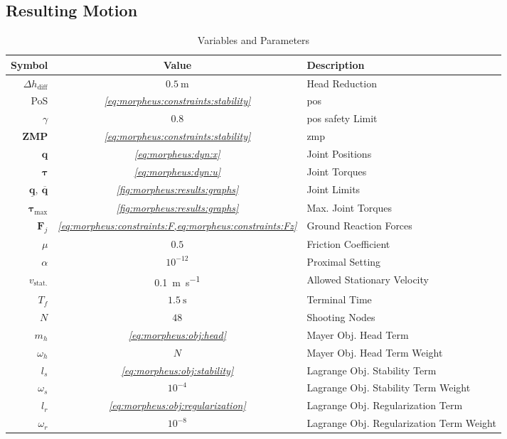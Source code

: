 \subsection{Resulting Motion} \label{sec:morpheus:results}
\begin{table}[h]
  \centering
  \begin{tabularx}{0.7\textwidth}{rcl}
  \toprule
    Symbol & Value & \multicolumn{1}{X}{Description} \\
  \midrule
    $\Delta h_\text{diff}$ & $\SI{0.5}{\metre}$ & Head Reduction \\
  \midrule
  PoS & \textit{\cref{eq:morpheus:constraints:stability}} & \acrlong{pos} \\
    $\gamma$ & $0.8$ & \acrshort{pos} safety Limit \\
    \textbf{ZMP} & \textit{\cref{eq:morpheus:constraints:stability}} & \acrlong{zmp} \\
  \midrule
    $\bm q$ & \textit{\cref{eq:morpheus:dyn:x}} & Joint Positions \\
  $\bm{\tau}$ & \textit{\cref{eq:morpheus:dyn:u}} & Joint Torques \\
    \midrule
  $\bm{\underline q},\ \bm{\overline q}$ & \textit{\cref{fig:morpheus:results:graphs}} & Joint Limits \\
    $\bm{\tau}_{\text{max}}$ & \textit{\cref{fig:morpheus:results:graphs}} & Max. Joint Torques \\
  \midrule
  $\bm F_j$ & \textit{\cref{eq:morpheus:constraints:F,eq:morpheus:constraints:Fz}} & Ground Reaction Forces \\
    $\mu$ & $0.5$ & Friction Coefficient \\
    $\alpha$ & $10^{-12}$ & Proximal Setting \\
  \midrule
    $v_{\text{stat.}}$ & \SI{0.1}{\metre \per \second} & Allowed Stationary Velocity \\
  \midrule
    $T_f$ & $\SI{1.5}{\second}$ & Terminal Time \\
    $N$ & $48$ & Shooting Nodes \\
    $m_h$ & \textit{\cref{eq:morpheus:obj:head}} & Mayer Obj. Head Term \\
    $\omega_h$ & $N$ & Mayer Obj. Head Term Weight \\
    $l_s$ & \textit{\cref{eq:morpheus:obj:stability}} & Lagrange Obj. Stability Term \\
    $\omega_s$ & $10^{-4}$ & Lagrange Obj. Stability Term Weight \\
    $l_r$ & \textit{\cref{eq:morpheus:obj:regularization}} & Lagrange Obj. Regularization Term \\
    $\omega_r$ & $10^{-8}$ & Lagrange Obj. Regularization Term Weight \\
  \bottomrule
  \end{tabularx}
  \caption{Variables and Parameters}
  \label{tab:morpheus:variables}
\end{table}
